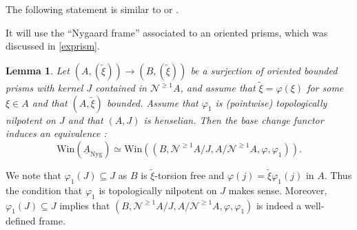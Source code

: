 \documentclass{amsart}
\theoremstyle{plain}
\newtheorem{lemma}[theorem]{Lemma}
\theoremstyle{definition}
\newcommand{\tilxi}{\tilde{\xi}}
\newcommand{\blue}[1]{{\color{black}#1}}
\begin{document}
The following statement is similar to \cite[Lemma 2.12]{lau_frames_and_finite_group_schemes_over_complete_regular_local_rings} or \cite[Appendix A.4]{kisin_crystalline_representations_and_f_crystals}.

  It will use the ``Nygaard frame'' associated to an oriented \blue{prisms}, which was discussed in \ref{exprism}. 
  
\begin{lemma}
  \label{sec:essent-surj-lemma-equivalence-on-window-categories}
  Let $(A,(\tilxi)) \to (B,(\tilxi))$ be a surjection of oriented \blue{bounded} prisms with kernel $J$ contained in $\mathcal{N}^{\geq 1}A$, and assume that $\tilxi=\varphi(\xi)$ for some $\xi \in A$ and that $(A,\tilxi)$ bounded. Assume that $\varphi_1$ is (pointwise) topologically nilpotent on $J$ and that $(A,J)$ is henselian.
  Then the base change functor induces an equivalence :
  $$\mathrm{Win}(\underline{A}_{\mathrm{Nyg}}) \simeq \mathrm{Win}((B,\mathcal{N}^{\geq 1} A/J,A/\mathcal{N}^{\geq 1}A, \varphi,\varphi_1)).$$
\end{lemma}

We note that $\varphi_1(J)\subseteq J$ as $B$ is $\tilxi$-torsion free and $\varphi(j)=\tilxi\varphi_1(j)$ in $A$. Thus the condition that $\varphi_1$ is topologically nilpotent on $J$ makes sense. Moreover, $\varphi_1(J)\subseteq J$ implies that $(B,\mathcal{N}^{\geq 1} A/J, A/\mathcal{N}^{\geq 1}A, \varphi,\varphi_1)$ is indeed a well-defined frame.
\end{document}
